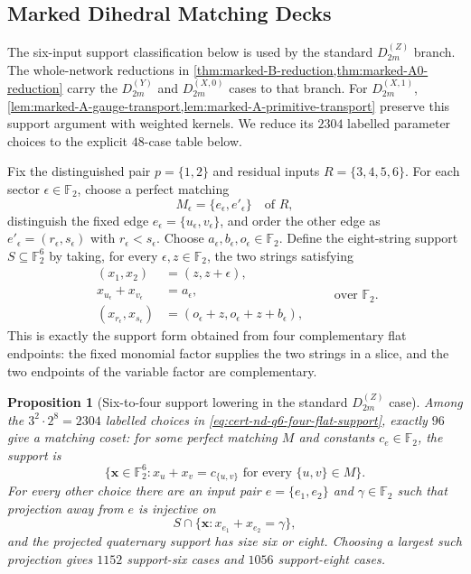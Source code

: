 \documentclass[11pt,letterpaper,onecolumn]{article}
\theoremstyle{plain}
\newtheorem{proposition}[proposition]{Proposition}
\theoremstyle{definition}
\theoremstyle{remark}
\newcommand{\Ftwo}{\mathbb F_2}
\newcommand{\DihZ}[1]{{D_{#1}^{(Z)}}}
\newcommand{\DihY}[1]{{D_{#1}^{(Y)}}}
\newcommand{\DihXzero}[1]{{D_{#1}^{(X,0)}}}
\newcommand{\DihXone}[1]{{D_{#1}^{(X,1)}}}
\begin{document}
\subsection{Marked Dihedral Matching Decks}
\label{appsec:cert-marked-dihedral}
\label{proofsubsec:cert-normalized-dih-q6}

The six-input support classification below is used by the standard
\(\DihZ{2m}\) branch. The whole-network reductions in
\cref{thm:marked-B-reduction,thm:marked-A0-reduction} carry the
\(\DihY{2m}\) and \(\DihXzero{2m}\) cases to that branch.
For \(\DihXone{2m}\), \cref{lem:marked-A-gauge-transport,lem:marked-A-primitive-transport}
preserve this support argument with weighted kernels. We reduce its
\(2304\) labelled parameter choices to the explicit \(48\)-case table below.

Fix the distinguished pair \(p=\{1,2\}\) and residual inputs
\(R=\{3,4,5,6\}\).  For each sector
\(\epsilon\in\Ftwo\), choose a perfect matching
\[
 M_\epsilon=\{e_\epsilon,e'_\epsilon\}
 \quad\text{of }R,
\]
distinguish the fixed edge
\(e_\epsilon=\{u_\epsilon,v_\epsilon\}\), and order the other edge as
\(e'_\epsilon=(r_\epsilon,s_\epsilon)\) with
\(r_\epsilon<s_\epsilon\).    Choose
\(a_\epsilon,b_\epsilon,o_\epsilon\in\Ftwo\).  Define the eight-string
support \(S\subseteq\Ftwo^6\) by taking, for every
\(\epsilon,z\in\Ftwo\), the two strings satisfying
\begin{equation}
 \begin{aligned}
 (x_1,x_2)&=(z,z+\epsilon),\\
 x_{u_\epsilon}+x_{v_\epsilon}&=a_\epsilon,\\
 (x_{r_\epsilon},x_{s_\epsilon})
   &=(o_\epsilon+z,o_\epsilon+z+b_\epsilon),
 \end{aligned}
 \qquad\text{over }\Ftwo.
 \label{eq:cert-nd-q6-four-flat-support}
\end{equation}
This is exactly the support form obtained from four complementary flat
endpoints: the fixed monomial factor supplies the two strings in a slice,
and the two endpoints of the variable factor are complementary.

\begin{proposition}[Six-to-four support lowering in the standard \(\DihZ{2m}\) case]
\label{prop:cert-nd-q6-support-lowering}
Among the \(3^2\cdot2^8=2304\) labelled choices in \cref{eq:cert-nd-q6-four-flat-support}, exactly \(96\)
give a matching coset: for some perfect matching \(M\) and constants
\(c_e\in\Ftwo\), the support is
\[
  \{{\mathbf{x}}\in\Ftwo^6:x_u+x_v=c_{\{u,v\}}
      \text{ for every }\{u,v\}\in M\}.
\]
For every other choice there are an input pair \(e=\{e_1,e_2\}\) and
\(\gamma\in\Ftwo\) such that projection away from \(e\) is injective on
\[
 S\cap\{{\mathbf{x}}:x_{e_1}+x_{e_2}=\gamma\},
\]
and the projected quaternary support has size six or eight.  Choosing a
largest such projection gives \(1152\) support-six cases and \(1056\)
support-eight cases.
\end{proposition}
\end{document}
